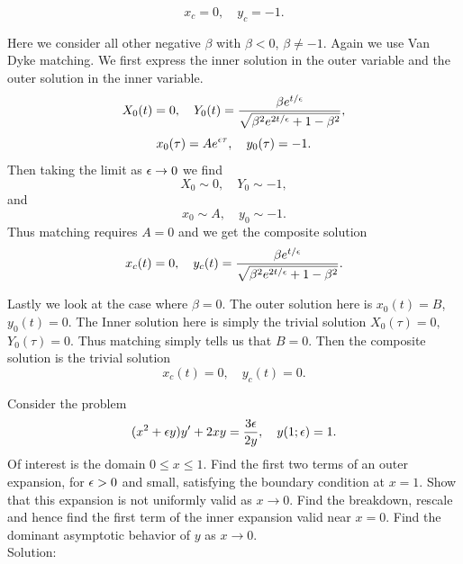         $$x_c=0,\quad y_c=-1.$$
    \item Here we consider all other negative $\beta$ with $\beta<0$, $\beta\neq-1$. Again we use Van Dyke matching. We first express the inner solution in the outer variable and the outer solution in the inner variable.
        $$X_0(t)=0,\quad Y_0(t)=\frac{\beta e^{t/\epsilon}}{\sqrt{\beta^2e^{2t/\epsilon}+1-\beta^2}},$$
        $$x_0(\tau)=Ae^{\epsilon\tau},\quad y_0(\tau)=-1.$$
        Then taking the limit as $\epsilon\to 0$ we find
        $$X_0\sim 0,\quad Y_0\sim -1,$$
        and
        $$x_0\sim A,\quad y_0\sim -1.$$
        Thus matching requires $A=0$ and we get the composite solution
        $$x_c(t)=0,\quad y_c(t)= \frac{\beta e^{t/\epsilon}}{\sqrt{\beta^2e^{2t/\epsilon}+1-\beta^2}}.$$
    \item Lastly we look at the case where $\beta=0.$ The outer solution here is $x_0(t)=B$, $y_0(t)=0.$ The Inner solution here is simply the trivial solution $X_0(\tau)=0,$ $Y_0(\tau)=0.$ Thus matching simply tells us that $B=0.$ Then the composite solution is the trivial solution
        $$x_c(t)=0,\quad y_c(t)=0.$$
        \eenum
        \eenum





\item Consider the problem
\begin{equation*}
(x^2+\epsilon y)y' + 2xy = \frac{3\epsilon}{2y}, \quad y(1;\epsilon) = 1.
\end{equation*}
Of interest is the domain $0\le x \le 1.$  Find the first two terms of an outer expansion, for $\epsilon>0$ and small, satisfying the boundary condition at $x=1.$  Show that this expansion is not uniformly valid as $x \to 0.$  Find the breakdown, rescale and hence find the first term of the inner expansion valid near $x=0.$  Find the dominant asymptotic behavior of $y$ as $x \to 0.$\\

Solution:\\

